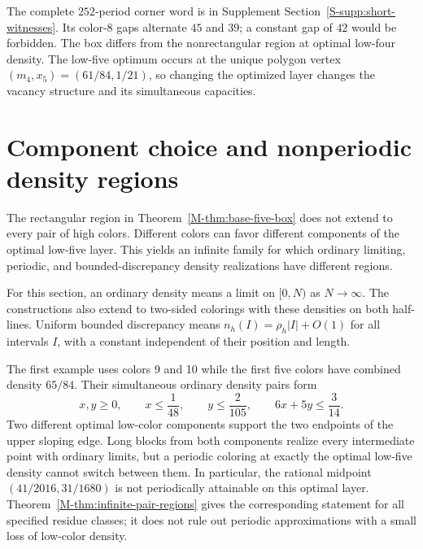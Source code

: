\documentclass[11pt,reqno]{amsart}
\theoremstyle{plain}
\theoremstyle{plain}
\theoremstyle{plain}
\begin{document}
The complete $252$-period corner word is in Supplement
Section~\ref*{S-supp:short-witnesses}.
Its color-$8$ gaps alternate $45$ and $39$; a constant gap of $42$
would be forbidden. The box differs from the nonrectangular region at
optimal low-four density. The low-five optimum occurs at the unique
polygon vertex $(m_4,x_5)=(61/84,1/21)$, so changing the optimized
layer changes the vacancy structure and its simultaneous capacities.



\section{Component choice and nonperiodic density regions}
\label{M-sec:component-competition}

The rectangular region in Theorem~\ref{M-thm:base-five-box} does not extend
to every pair of high colors. Different colors can favor different
components of the optimal low-five layer. This yields an infinite family
for which ordinary limiting, periodic, and bounded-discrepancy density
realizations have different regions.

For this section, an ordinary density means a limit on $[0,N)$ as
$N\to\infty$. The constructions also extend to two-sided colorings
with these densities on both half-lines. Uniform bounded discrepancy
means $n_h(I)=\rho_h|I|+O(1)$ for all intervals $I$, with a constant
independent of their position and length.

The first example uses colors 9 and 10 while the first five colors have
combined density $65/84$. Their simultaneous ordinary density pairs form
\[
 x,y\ge0,\qquad x\le\frac1{48},\qquad y\le\frac2{105},
 \qquad 6x+5y\le\frac3{14}.
\]
Two different optimal low-color components support the two endpoints of the
upper sloping edge. Long blocks from both components realize every intermediate
point with ordinary limits, but a periodic coloring at exactly the optimal
low-five density cannot switch between them. In particular, the rational
midpoint $(41/2016,31/1680)$ is not periodically attainable on this optimal
layer. Theorem~\ref{M-thm:infinite-pair-regions} gives the corresponding statement for all specified
residue classes; it does not rule out periodic approximations with a small
loss of low-color density.
\end{document}
